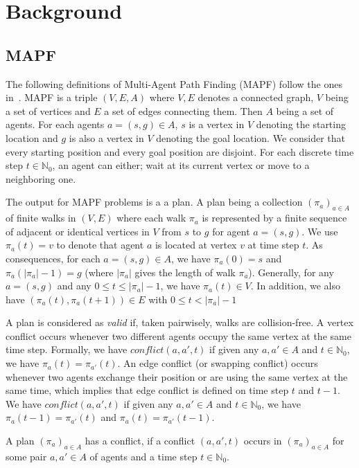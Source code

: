 \section{Background}\label{sec:background}
\subsection{MAPF}

The following definitions of Multi-Agent Path Finding (MAPF) follow the ones in~\cite{husvobbass22a}. MAPF is a triple $(V,E,A)$ where \(V,E\) denotes a connected graph, \(V\) being a set of vertices and \(E\) a set of edges connecting them. Then \(A\) being a set of agents. For each agents \(a=(s,g) \in A\), \(s\) is a vertex in \(V\) denoting the starting location and \(g\) is also a vertex in \(V\) denoting the goal location. We consider that every starting position and every goal position are disjoint.
For each discrete time step \(t\in \mathbb{N}_0\), an agent can either; wait at its current vertex or move to a neighboring one.

The output for MAPF problems is a a plan. A plan being a collection $(\pi_a)_{a\in A}$ of finite walks in $(V,E)$ where each walk $\pi_a$ is represented by a finite sequence of adjacent or identical vertices in $V$ from $s$ to $g$ for agent $a = (s,g)$. We use \(\pi_a (t) = v\) to denote that agent \(a\) is located at vertex \(v\) at time step \(t\). 
As consequences, for each \(a=(s,g) \in A\), we have $\pi_a(0) = s$ and  $\pi_a(|\pi_a|-1) = g$ (where $|\pi_a|$ gives the length of walk $\pi_a$). Generally, for any \(a=(s,g)\) and any $0 \leq t \leq |\pi_a|-1$, we have \(\pi_a(t) \in V\). In addition, we also have $(\pi_a(t),\pi_a(t+1))\in E$ with $0 \leq t < |\pi_a|-1$

A plan is considered as \textit{valid} if, taken pairwisely, walks are collision-free. A vertex conflict occurs whenever two different agents occupy the same vertex at the same time step. Formally, we have \(conflict(a,a',t)\) if given any $a,a'\in A$  and $t\in\mathbb{N}_0$, we have $\pi_a(t) = \pi_{a'}(t)$. An edge conflict (or swapping conflict) occurs whenever two agents exchange their position or are using the same vertex at the same time, which implies that edge conflict is defined on time step \(t\) and \(t-1\). We have \(conflict(a,a',t)\) if given any $a,a'\in A$  and $t\in\mathbb{N}_0$, we have $\pi_a(t-1) = \pi_{a'}(t)$ and $\pi_a(t) = \pi_{a'}(t-1)$.

A plan $(\pi_a)_{a\in A}$ has a conflict, if a conflict $(a, a',t)$ occurs in $(\pi_a)_{a\in A}$ for some pair $a,a'\in A$ of agents and a time step $t\in\mathbb{N}_0$.

